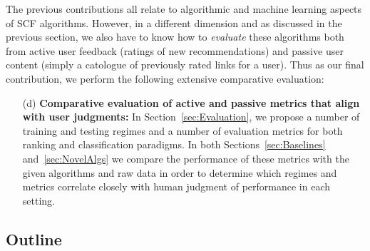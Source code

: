 \documentclass{sig-alternate}
\begin{document}
The previous contributions all relate to algorithmic and machine
learning aspects of SCF algorithms.  However, in a different dimension
and as discussed in the previous section, we also have to know how to
\emph{evaluate} these algorithms both from active user feedback
(ratings of new recommendations) and passive user content (simply a
catologue of previously rated links for a user).  Thus as our final
contribution, we perform the following extensive comparative
evaluation:
\begin{enumerate}
\item[(d)] {\bf Comparative evaluation of active and passive metrics 
that align with user judgments:} 
In Section~\ref{sec:Evaluation}, we
propose a number of training and testing regimes and a number of
evaluation metrics for both ranking and classification paradigms.  In
both Sections~\ref{sec:Baselines} and~\ref{sec:NovelAlgs} we compare
the performance of these metrics with the given algorithms and raw
data in order to determine which regimes and metrics correlate closely
with human judgment of performance in each setting.
\end{enumerate}

\subsection{Outline}
\end{document}
